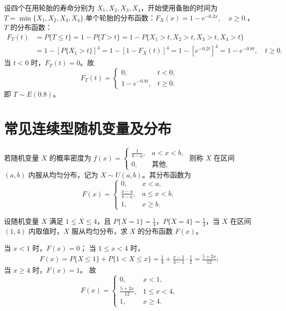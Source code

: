 \documentclass[lang=cn,11pt]{elegantbook}
\begin{document}
\begin{solution}
设四个在用轮胎的寿命分别为 $X_1,X_2,X_3,X_4$，开始使用备胎的时间为
\(T = \min\{X_1,X_2,X_3,X_4\}.\)单个轮胎的分布函数：\(
F_X(x) = 1-e^{-0.2x},\quad x\geqslant0.
\)，$T$ 的分布函数：
\[
\begin{aligned}
F_T(t) &= P\{T\leqslant t\} = 1-P\{T>t\} = 1-P\{X_1>t, X_2>t, X_3>t, X_4>t\} \\
&= 1-\left[P\{X_1>t\}\right]^4 = 1-\left[1-F_X(t)\right]^4 = 1-\left[e^{-0.2t}\right]^4 = 1-e^{-0.8t},\quad t\geqslant0.
\end{aligned}
\]
当 $t<0$ 时，$F_T(t)=0$。故
\[
F_T(t)=
\begin{cases}
0, & t<0, \\
1-e^{-0.8t}, & t\geqslant0.
\end{cases}
\]
即 $T\sim E(0.8)$。
\end{solution}



\section{常见连续型随机变量及分布}

\begin{definition}[均匀分布]\label{def:uniform-dist}
若随机变量 $X$ 的概率密度为
\(
f(x) = \begin{cases}
\frac{1}{b-a}, & a < x < b, \\
0, & \text{其他},
\end{cases}
\)
则称 $X$ 在区间 $(a,b)$ 内服从均匀分布，记为 $X \sim U(a,b)$。其分布函数为
\[
F(x) = \begin{cases}
0, & x < a, \\
\frac{x-a}{b-a}, & a \le x < b, \\
1, & x \ge b.
\end{cases}
\]
\end{definition}

\begin{exercise}\label{exer:2-13}
设随机变量 $X$ 满足 $1 \le X \le 4$，且 $P\{X=1\} = \frac{1}{4}$，$P\{X=4\} = \frac{1}{4}$，当 $X$ 在区间 $(1,4)$ 内取值时，$X$ 服从均匀分布，求 $X$ 的分布函数 $F(x)$。
\end{exercise}
\begin{solution}
当 $x < 1$ 时，$F(x) = 0$；
当 $1 \le x < 4$ 时，
\[
\begin{aligned}
F(x) = P\{X \le 1\} + P\{1 < X \le x\} = \frac{1}{4} + \frac{x-1}{4-1} \cdot \frac{1}{2} = \frac{5 + 2x}{12};
\end{aligned}
\]
当 $x \ge 4$ 时，$F(x) = 1$。
故
\[
F(x) = \begin{cases}
0, & x < 1, \\
\frac{5 + 2x}{12}, & 1 \le x < 4, \\
1, & x \ge 4.
\end{cases}
\]
\end{solution}
\end{document}
